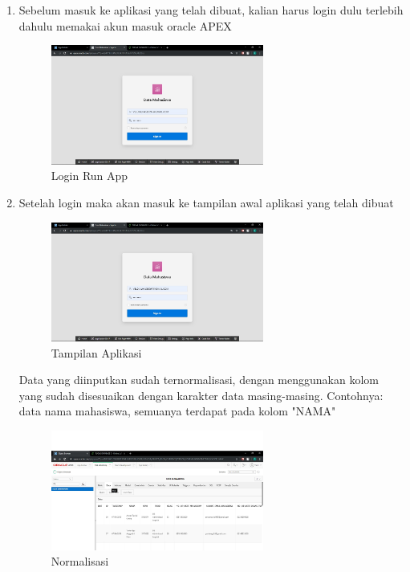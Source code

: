 \documentclass{article}
\begin{document}
\begin{enumerate}
    \item Sebelum masuk ke aplikasi yang telah dibuat, kalian harus login dulu terlebih dahulu memakai akun masuk oracle APEX
    \begin{figure}[h]
	\centering
	\includegraphics[width=7cm]{Figure/LRA.jpg}
	\caption{Login Run App}
	\label{fig:gambar}
	\end{figure}
    
    \item Setelah login maka akan masuk ke tampilan awal aplikasi yang telah dibuat
     \begin{figure}[h]
	\centering
	\includegraphics[width=7cm]{Figure/LRA.jpg}
	\caption{Tampilan Aplikasi}
	\label{fig:gambar}
	\end{figure}
	
Data yang diinputkan sudah ternormalisasi, dengan menggunakan kolom yang sudah  disesuaikan dengan karakter data masing-masing. Contohnya: data nama mahasiswa, semuanya terdapat pada kolom "NAMA"
     \begin{figure}[h]
	\centering
	\includegraphics[width=7cm]{Figure/NORM.jpg}
	\caption{Normalisasi}
	\label{fig:gambar}
	\end{figure}

	
\end{enumerate}
\end{document}
